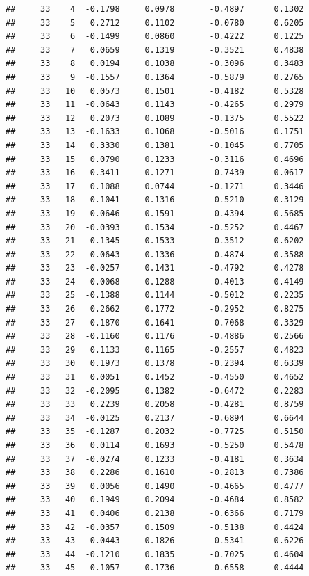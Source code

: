 \documentclass[
]{article}
\begin{document}
\begin{verbatim}
##     33    4  -0.1798     0.0978       -0.4897      0.1302 
##     33    5   0.2712     0.1102       -0.0780      0.6205 
##     33    6  -0.1499     0.0860       -0.4222      0.1225 
##     33    7   0.0659     0.1319       -0.3521      0.4838 
##     33    8   0.0194     0.1038       -0.3096      0.3483 
##     33    9  -0.1557     0.1364       -0.5879      0.2765 
##     33   10   0.0573     0.1501       -0.4182      0.5328 
##     33   11  -0.0643     0.1143       -0.4265      0.2979 
##     33   12   0.2073     0.1089       -0.1375      0.5522 
##     33   13  -0.1633     0.1068       -0.5016      0.1751 
##     33   14   0.3330     0.1381       -0.1045      0.7705 
##     33   15   0.0790     0.1233       -0.3116      0.4696 
##     33   16  -0.3411     0.1271       -0.7439      0.0617 
##     33   17   0.1088     0.0744       -0.1271      0.3446 
##     33   18  -0.1041     0.1316       -0.5210      0.3129 
##     33   19   0.0646     0.1591       -0.4394      0.5685 
##     33   20  -0.0393     0.1534       -0.5252      0.4467 
##     33   21   0.1345     0.1533       -0.3512      0.6202 
##     33   22  -0.0643     0.1336       -0.4874      0.3588 
##     33   23  -0.0257     0.1431       -0.4792      0.4278 
##     33   24   0.0068     0.1288       -0.4013      0.4149 
##     33   25  -0.1388     0.1144       -0.5012      0.2235 
##     33   26   0.2662     0.1772       -0.2952      0.8275 
##     33   27  -0.1870     0.1641       -0.7068      0.3329 
##     33   28  -0.1160     0.1176       -0.4886      0.2566 
##     33   29   0.1133     0.1165       -0.2557      0.4823 
##     33   30   0.1973     0.1378       -0.2394      0.6339 
##     33   31   0.0051     0.1452       -0.4550      0.4652 
##     33   32  -0.2095     0.1382       -0.6472      0.2283 
##     33   33   0.2239     0.2058       -0.4281      0.8759 
##     33   34  -0.0125     0.2137       -0.6894      0.6644 
##     33   35  -0.1287     0.2032       -0.7725      0.5150 
##     33   36   0.0114     0.1693       -0.5250      0.5478 
##     33   37  -0.0274     0.1233       -0.4181      0.3634 
##     33   38   0.2286     0.1610       -0.2813      0.7386 
##     33   39   0.0056     0.1490       -0.4665      0.4777 
##     33   40   0.1949     0.2094       -0.4684      0.8582 
##     33   41   0.0406     0.2138       -0.6366      0.7179 
##     33   42  -0.0357     0.1509       -0.5138      0.4424 
##     33   43   0.0443     0.1826       -0.5341      0.6226 
##     33   44  -0.1210     0.1835       -0.7025      0.4604 
##     33   45  -0.1057     0.1736       -0.6558      0.4444 

\end{verbatim}
\end{document}
